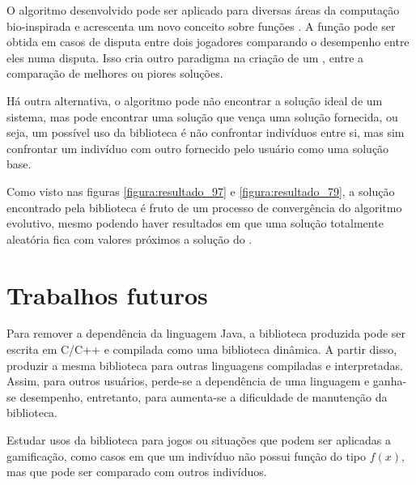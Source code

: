 O algoritmo desenvolvido pode ser aplicado para diversas áreas da computação bio-inspirada e acrescenta um novo conceito sobre funções \fitness. A função \fitness pode ser obtida em casos de disputa entre dois jogadores comparando o desempenho entre eles numa disputa. Isso cria outro paradigma na criação de um \SE, entre a comparação de melhores ou piores soluções.

Há outra alternativa, o algoritmo pode não encontrar a solução ideal de um sistema, mas pode encontrar uma solução que vença uma solução fornecida, ou seja, um possível uso da biblioteca é não confrontar indivíduos entre si, mas sim confrontar um indivíduo com outro fornecido pelo usuário como uma solução base.

Como visto nas figuras \ref{figura:resultado_97} e \ref{figura:resultado_79}, a solução encontrado pela biblioteca é fruto de um processo de convergência do algoritmo evolutivo, mesmo podendo haver resultados em que uma solução totalmente aleatória fica com valores próximos a solução do \SE.

\section{Trabalhos futuros}

Para remover a dependência da linguagem Java, a biblioteca produzida pode ser escrita em C/C++ e compilada como uma biblioteca dinâmica. A partir disso, produzir a mesma biblioteca para outras linguagens compiladas e interpretadas. Assim, para outros usuários, perde-se a dependência de uma linguagem e ganha-se desempenho, entretanto, para aumenta-se a dificuldade de manutenção da biblioteca.

Estudar usos da biblioteca para jogos ou situações que podem ser aplicadas a gamificação, como casos em que um indivíduo não possui função \fitness do tipo $f(x)$, mas que pode ser comparado com outros indivíduos.